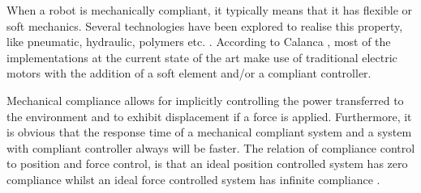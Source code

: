 When a robot is mechanically compliant, it typically means that it has flexible or soft mechanics. Several technologies have been explored to realise this property, like pneumatic, hydraulic, polymers etc. \cite{calanca2015review}. According to Calanca \cite{calanca2015review}, most of the implementations at the current state of the art make use of traditional electric motors with the addition of a soft element and/or a compliant controller.

Mechanical compliance allows for implicitly controlling the power transferred to the environment and to exhibit displacement if a force is applied. Furthermore, it is obvious that the response time of a mechanical compliant system and a system with compliant controller always will be faster. The relation of compliance control to position and force control, is that an ideal position controlled system has zero compliance whilst an ideal force controlled system has infinite compliance \cite{calanca2015review}. 



